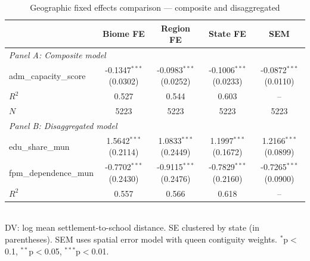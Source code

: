 \begin{table}[h]
\centering
\caption{Geographic fixed effects comparison — composite and disaggregated}
\begin{tabular}{lcccc}
\toprule
& Biome FE & Region FE & State FE & SEM \\
\midrule
\multicolumn{5}{l}{\textit{Panel A: Composite model}} \\
adm\_capacity\_score & -0.1347$^{***}$ (0.0302) & -0.0983$^{***}$ (0.0252) & -0.1006$^{***}$ (0.0233) & -0.0872$^{***}$ (0.0110) \\
$R^2$ & 0.527 & 0.544 & 0.603 & -- \\
$N$ & 5223 & 5223 & 5223 & 5223 \\
\midrule
\multicolumn{5}{l}{\textit{Panel B: Disaggregated model}} \\
edu\_share\_mun & 1.5642$^{***}$ (0.2114) & 1.0833$^{***}$ (0.2449) & 1.1997$^{***}$ (0.1672) & 1.2166$^{***}$ (0.0899) \\
fpm\_dependence\_mun & -0.7702$^{***}$ (0.2430) & -0.9115$^{***}$ (0.2476) & -0.7829$^{***}$ (0.2160) & -0.7265$^{***}$ (0.0900) \\
$R^2$ & 0.557 & 0.566 & 0.618 & -- \\
\bottomrule
\end{tabular}
\\[4pt]
\footnotesize{DV: log mean settlement-to-school distance. SE clustered by state (in parentheses). SEM uses spatial error model with queen contiguity weights. $^{*}$p$<$0.1, $^{**}$p$<$0.05, $^{***}$p$<$0.01.}
\end{table}
